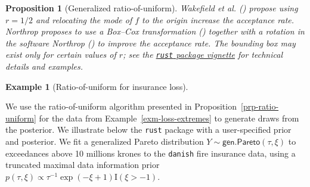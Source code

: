 \documentclass[
  11pt,
  letterpaper,
]{scrbook}
\theoremstyle{definition}
\newtheorem{example}{Example}[chapter]
\theoremstyle{plain}
\newtheorem{proposition}{Proposition}[chapter]
\theoremstyle{plain}
\theoremstyle{plain}
\theoremstyle{definition}
\theoremstyle{definition}
\theoremstyle{plain}
\newtheorem{proposition}{Proposition}[chapter]
\theoremstyle{plain}
\theoremstyle{remark}
\begin{document}
\begin{proposition}[Generalized
ratio-of-uniform]
Wakefield et al. ()
propose using \(r=1/2\) and relocating the mode of \(f\) to the origin
increase the acceptance rate. Northrop proposes to use a Box--Cox
transformation () together
with a rotation in the software Northrop () to
improve the acceptance rate. The bounding box may exist only for certain
values of \(r\); see the
\href{https://paulnorthrop.github.io/rust/articles/rust-a-vignette.html}{\texttt{rust}
package vignette} for technical details and examples.

\end{proposition}

\begin{example}[Ratio-of-uniform for insurance
loss]\protect\hypertarget{exm-rust}{}\label{exm-rust}

We use the ratio-of-uniform algorithm presented in
Proposition~\ref{prp-ratio-uniform} for the data from
Example~\ref{exm-loss-extremes} to generate draws from the posterior. We
illustrate below the \texttt{rust} package with a user-specified prior
and posterior. We fit a generalized Pareto distribution
\(Y \sim \mathsf{gen. Pareto}(\tau, \xi)\) to exceedances above 10
millions krones to the \texttt{danish} fire insurance data, using a
truncated maximal data information prior
\(p(\tau, \xi) \propto \tau^{-1}\exp(-\xi+1)\mathrm{I}(\xi > -1).\)


\end{example}
\end{document}
